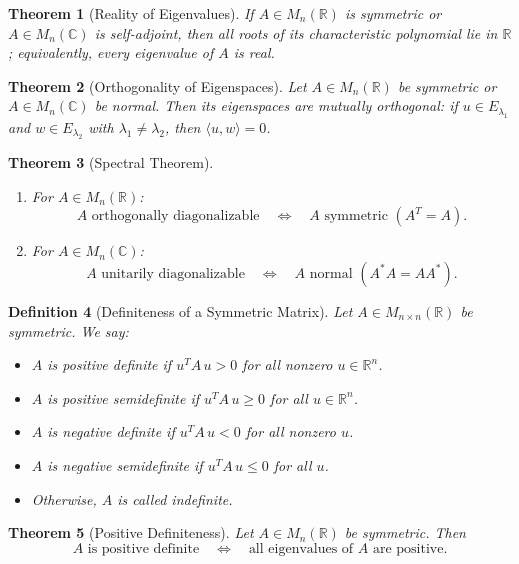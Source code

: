 \documentclass[12pt]{article}
\theoremstyle{break}             %
\newtheorem{thm}{Theorem}          %
\newtheorem{defn}[thm]{Definition}
\begin{document}
\begin{thm}[Reality of Eigenvalues]
If \(A\in M_n(\mathbb{R})\) is symmetric or \(A\in M_n(\mathbb{C})\) is self-adjoint, then all roots of its characteristic polynomial lie in \(\mathbb{R}\); equivalently, every eigenvalue of \(A\) is real.
\end{thm}

\begin{thm}[Orthogonality of Eigenspaces]
Let \(A\in M_n(\mathbb{R})\) be symmetric or \(A\in M_n(\mathbb{C})\) be normal.  Then its eigenspaces are mutually orthogonal: if \(u\in E_{\lambda_1}\) and \(w\in E_{\lambda_2}\) with \(\lambda_1\neq\lambda_2\), then \(\langle u,w\rangle=0\).
\end{thm}

\begin{thm}[Spectral Theorem]\leavevmode\vspace{-20.5pt}
\begin{enumerate}
  \item For \(A\in M_n(\mathbb{R})\):
  \[
    A \text{ orthogonally diagonalizable}
    \quad\Longleftrightarrow\quad
    A \text{ symmetric }(A^T=A).
  \]
  \item For \(A\in M_n(\mathbb{C})\):
  \[
    A \text{ unitarily diagonalizable}
    \quad\Longleftrightarrow\quad
    A \text{ normal }(A^*A=AA^*).
  \]
\end{enumerate}
\end{thm}

\begin{defn}[Definiteness of a Symmetric Matrix]
Let \(A\in M_{n\times n}(\mathbb{R})\) be symmetric.  We say:
\begin{itemize}
  \item \(A\) is \emph{positive definite} if \(u^T A\,u>0\) for all nonzero \(u\in\mathbb{R}^n\).
  \item \(A\) is \emph{positive semidefinite} if \(u^T A\,u\ge0\) for all \(u\in\mathbb{R}^n\).
  \item \(A\) is \emph{negative definite} if \(u^T A\,u<0\) for all nonzero \(u\).
  \item \(A\) is \emph{negative semidefinite} if \(u^T A\,u\le0\) for all \(u\).
  \item Otherwise, \(A\) is called \emph{indefinite}.
\end{itemize}
\end{defn}

\begin{thm}[Positive Definiteness]
Let \(A\in M_n(\mathbb{R})\) be symmetric.  Then
\[
A \text{ is positive definite}
\quad\Longleftrightarrow\quad
\text{all eigenvalues of }A\text{ are positive}.
\]
\end{thm}
\end{document}
